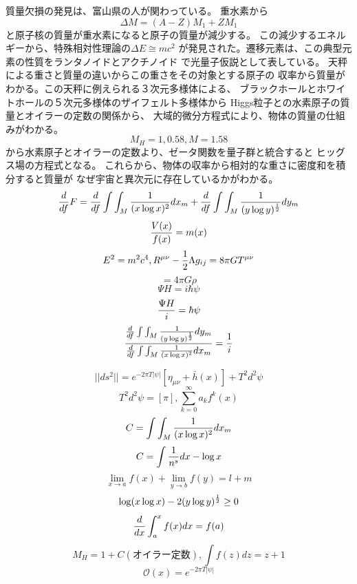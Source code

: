\documentclass{jsarticle}
\begin{document}
\title{}
\author{}
\date{}
\maketitle
   
  質量欠損の発見は、富山県の人が関わっている。
 重水素から $$ \Delta M = (A - Z)M_1 + ZM_1 $$ 
 と原子核の質量が重水素になると原子の質量が減少する。
 この減少するエネルギーから、特殊相対性理論の$ \Delta E \cong mc^2 $
 が発見された。遷移元素は、この典型元素の性質をランタノイドとアクチノイド
 で光量子仮説として表している。
 天秤による重さと質量の違いからこの重さをその対象とする原子の
 収率から質量がわかる。この天秤に例えられる３次元多様体による、
 ブラックホールとホワイトホールの５次元多様体のザイフェルト多様体から
 Higgs粒子との水素原子の質量とオイラーの定数の関係から、
 大域的微分方程式により、物体の質量の仕組みがわかる。
 $$ M_H = 1, 0.58, M = 1.58 $$
 から水素原子とオイラーの定数より、ゼータ関数を量子群と統合すると
 ヒッグス場の方程式となる。
 これらから、物体の収率から相対的な重さに密度和を積分すると質量が
 なぜ宇宙と異次元に存在しているかがわかる。
 $$ {d \over df}F = {d \over df}\int\int_M {1 \over (x \log x)^2}dx_m
  + {d \over df}\int\int_M {1 \over (y \log y)^{1 \over 2}}dy_m $$
 $$ {V(x) \over f(x)} = m(x) $$
 $$ E^2 = m^2c^4, R^{\mu\nu} - {1 \over 2}\Lambda g_{ij}
 = 8 \pi G T^{\mu\nu} $$
 $$ = 4 \pi G \rho $$
 $$ \Psi H = i \hbar \psi $$
 $$ {\Psi H \over i} = \hbar \psi $$
 $$ {{d \over df} \int \int_M { 1 \over (y \log y)^{1 \over 2}}dy_m
   \over {d \over df} \int \int_M { 1 \over (x \log x)^2}dx_m }
 = {1 \over i} $$


  $$ ||ds^2|| = e^{-2\pi T|\psi|}[\eta_{\mu\nu} + \bar{h}(x)]
   + T^2 d^2 \psi $$
   $$ T^2 d^2 \psi = [\pi], \sum_{k=0}^{\infty}a_k f^k(x) $$
   $$ C = \int\int_M {1 \over (x \log x)^2}dx_m $$
   $$ C = \int{1 \over n^s}dx - \log x $$
   $$ \lim_{x\to a}f(x) + \lim_{y\to b}f(y) = l + m $$
   $$ \log (x \log x) - 2(y \log y)^{1 \over 2} \ge 0 $$
   $$ {d \over dx}\int^{x}_a f(x)dx = f(a) $$
   $$ M_H = 1 + C(オイラー定数), 
    \int f(z)dz = z + 1 $$
    $$ \mathcal{O}(x) = e^{-2 \pi T|\psi|} $$



 
\end{document}
